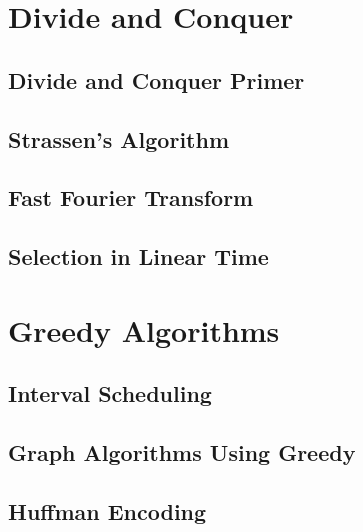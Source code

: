 \documentclass[11pt,fleqn,dvipsnames]{book} %
\begin{document}
\pagestyle{fancy} %

\setlength{\parskip}{1em}

\part{Divide and Conquer}

\chapter{Divide and Conquer Primer}


\chapter{Strassen's Algorithm}


\chapter{Fast Fourier Transform}


\chapter{Selection in Linear Time}


\part{Greedy Algorithms}

\chapter{Interval Scheduling}


\chapter{Graph Algorithms Using Greedy}


\chapter{Huffman Encoding}
\end{document}
